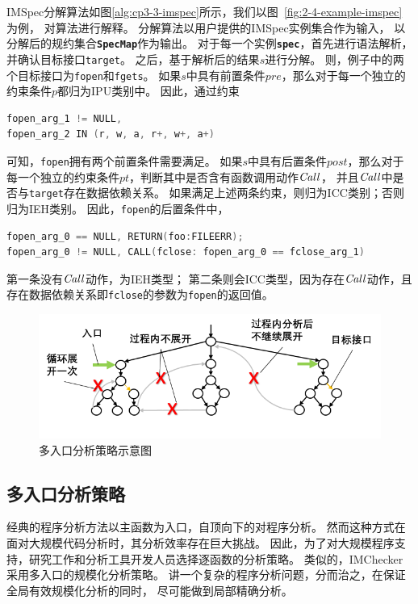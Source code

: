 

IMSpec分解算法如图\ref{alg:cp3-3-imspec}所示，我们以图~\ref{fig:2-4-example-imspec}为例，
对算法进行解释。
分解算法以用户提供的IMSpec实例集合作为输入，
以分解后的规约集合\textbf{\texttt{SpecMap}}作为输出。
对于每一个实例\textbf{\texttt{spec}}，首先进行语法解析，并确认目标接口\texttt{target}。
之后，基于解析后的结果$s$进行分解。
则，例子中的两个目标接口为\texttt{fopen}和\texttt{fgets}。
如果$s$中具有前置条件$pre$，那么对于每一个独立的约束条件$p$都归为IPU类别中。
因此，通过约束
\begin{lstlisting}[language={C},
basicstyle=\linespread{0.8}\listingsfont,
numbers=none,
xleftmargin=.25\textwidth]
fopen_arg_1 != NULL,
fopen_arg_2 IN (r, w, a, r+, w+, a+)
\end{lstlisting}
可知，\texttt{fopen}拥有两个前置条件需要满足。
如果$s$中具有后置条件$post$，那么对于每一个独立的约束条件$pt$，判断其中是否含有函数调用动作$\mathit{Call}$，
并且$\mathit{Call}$中是否与\texttt{target}存在数据依赖关系。
如果满足上述两条约束，则归为ICC类别；否则归为IEH类别。
因此，\texttt{fopen}的后置条件中，
\begin{lstlisting}[language={C},
basicstyle=\linespread{0.8}\listingsfont,
numbers=none,
xleftmargin=.25\textwidth]
fopen_arg_0 == NULL, RETURN(foo:FILEERR);
fopen_arg_0 != NULL, CALL(fclose: fopen_arg_0 == fclose_arg_1)
\end{lstlisting}
第一条没有$\mathit{Call}$动作，为IEH类型；
第二条则会ICC类型，因为存在$\mathit{Call}$动作，且存在数据依赖关系即\texttt{fclose}的参数为\texttt{fopen}的返回值。

\begin{figure}[t]
	\centering
	\includegraphics[width=0.9\linewidth]{figures/cp3-3-multi-entry.png}
	\caption{
		多入口分析策略示意图
	}
	\label{fig:3-3-multi-entry}
\end{figure}

\subsection{多入口分析策略}
经典的程序分析方法以主函数为入口，自顶向下的对程序分析。
然而这种方式在面对大规模代码分析时，其分析效率存在巨大挑战。
因此，为了对大规模程序支持，研究工作和分析工具开发人员选择逐函数的分析策略。
类似的，IMChecker采用多入口的规模化分析策略。
讲一个复杂的程序分析问题，分而治之，在保证全局有效规模化分析的同时，
尽可能做到局部精确分析。

